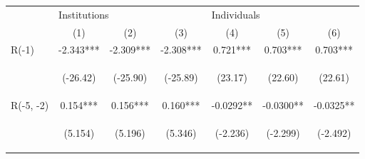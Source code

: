 \documentclass[border=0.2cm]{standalone}
\begin{document}
\begin{tabular}{lcccccc}
    \toprule
                      & \multicolumn{3}{l}{Institutions}               & \multicolumn{3}{l}{Individuals}                                                                                                                                                                                                                    \\
    \cmidrule(l){2-4} \cmidrule(l){5-7}
                      & (1)                                            & (2)                                            & (3)                                            & (4)                                            & (5)                                            & (6)                                            \\
    \midrule
    R(-1)             & -2.343***                                      & -2.309***                                      & -2.308***                                      & 0.721***                                       & 0.703***                                       & 0.703***                                       \\
    \vspace{4pt}      & \begin{footnotesize}(-26.42)\end{footnotesize} & \begin{footnotesize}(-25.90)\end{footnotesize} & \begin{footnotesize}(-25.89)\end{footnotesize} & \begin{footnotesize}(23.17)\end{footnotesize}  & \begin{footnotesize}(22.60)\end{footnotesize}  & \begin{footnotesize}(22.61)\end{footnotesize}  \\
    R(-5, -2)         & 0.154***                                       & 0.156***                                       & 0.160***                                       & -0.0292**                                      & -0.0300**                                      & -0.0325**                                      \\
    \vspace{4pt}      & \begin{footnotesize}(5.154)\end{footnotesize}  & \begin{footnotesize}(5.196)\end{footnotesize}  & \begin{footnotesize}(5.346)\end{footnotesize}  & \begin{footnotesize}(-2.236)\end{footnotesize} & \begin{footnotesize}(-2.299)\end{footnotesize} & \begin{footnotesize}(-2.492)\end{footnotesize} \\

\end{tabular}
\end{document}
